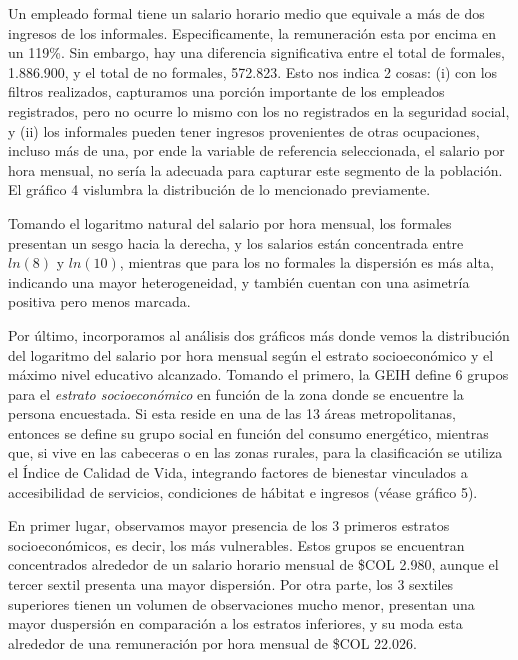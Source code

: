 \documentclass[11pt,oneside]{article}
\begin{document}
	
	Un empleado formal tiene un salario horario medio que equivale a más de dos ingresos de los informales. Especificamente, la remuneración esta por encima en un 119\%. Sin embargo, hay una diferencia significativa entre el total de formales, 1.886.900, y el total de no formales, 572.823. Esto nos indica 2 cosas: (i) con los filtros realizados, capturamos una porción importante de los empleados registrados, pero no ocurre lo mismo con los no registrados en la seguridad social, y (ii) los informales pueden tener ingresos provenientes de otras ocupaciones, incluso más de una, por ende la variable de referencia seleccionada, el salario por hora mensual, no sería la adecuada para capturar este segmento de la población. El gráfico 4 vislumbra la distribución de lo mencionado previamente. 
	
	
	Tomando el logaritmo natural del salario por hora mensual, los formales presentan un sesgo hacia la derecha, y los salarios están concentrada entre $ln(8)$ y $ln(10)$, mientras que para los no formales la dispersión es más alta, indicando una mayor heterogeneidad, y también cuentan con una asimetría positiva pero menos marcada.
	
	Por último, incorporamos al análisis dos gráficos más donde vemos la distribución del logaritmo del salario por hora mensual según el estrato socioeconómico y el máximo nivel educativo alcanzado. Tomando el primero, la GEIH define 6 grupos para el \textit{estrato socioeconómico} en función de la zona donde se encuentre la persona encuestada. Si esta reside en una de las 13 áreas metropolitanas, entonces se define su grupo social en función del consumo energético, mientras que, si vive en las cabeceras o en las zonas rurales, para la clasificación se utiliza el Índice de Calidad de Vida, integrando factores de bienestar vinculados a accesibilidad de servicios, condiciones de hábitat e ingresos (véase gráfico 5).
	
	
	En primer lugar, observamos mayor presencia de los 3 primeros estratos socioeconómicos, es decir, los más vulnerables. Estos grupos se encuentran concentrados alrededor de un salario horario mensual de \$COL 2.980, aunque el tercer sextil presenta una mayor dispersión. Por otra parte, los 3 sextiles superiores tienen un volumen de observaciones mucho menor, presentan una mayor duspersión en comparación a los estratos inferiores, y su moda esta alrededor de una remuneración por hora mensual de \$COL 22.026. 
	
\end{document}
